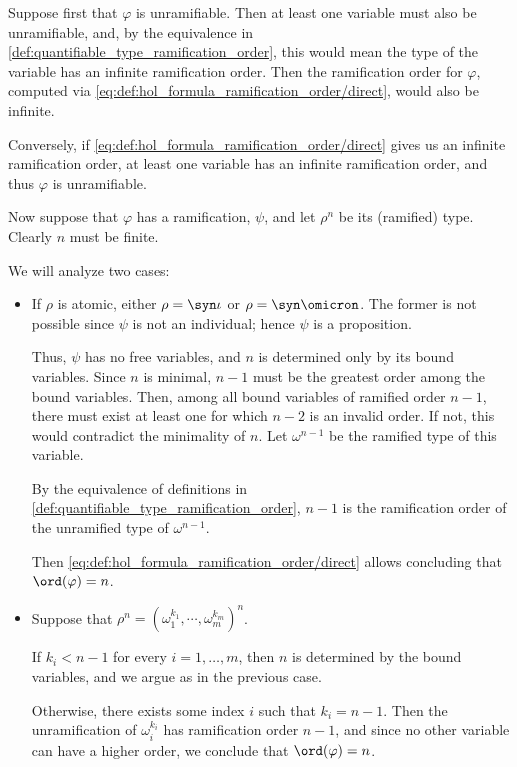 \begin{defproof}
  Suppose first that \( \varphi \) is unramifiable. Then at least one variable must also be unramifiable, and, by the equivalence in \cref{def:quantifiable_type_ramification_order}, this would mean the type of the variable has an infinite ramification order. Then the ramification order for \( \varphi \), computed via \eqref{eq:def:hol_formula_ramification_order/direct}, would also be infinite.

  Conversely, if \eqref{eq:def:hol_formula_ramification_order/direct} gives us an infinite ramification order, at least one variable has an infinite ramification order, and thus \( \varphi \) is unramifiable.

  Now suppose that \( \varphi \) has a ramification, \( \psi \), and let \( \rho^n \) be its (ramified) type. Clearly \( n \) must be finite.

  We will analyze two cases:
  \begin{itemize}
    \item If \( \rho \) is atomic, either \( \rho = \syn\iota \) or \( \rho = \syn\omicron \). The former is not possible since \( \psi \) is not an individual; hence \( \psi \) is a proposition.

    Thus, \( \psi \) has no free variables, and \( n \) is determined only by its bound variables. Since \( n \) is minimal, \( n - 1 \) must be the greatest order among the bound variables. Then, among all bound variables of ramified order \( n - 1 \), there must exist at least one for which \( n - 2 \) is an invalid order. If not, this would contradict the minimality of \( n \). Let \( \omega^{n-1} \) be the ramified type of this variable.

    By the equivalence of definitions in \cref{def:quantifiable_type_ramification_order}, \( n - 1 \) is the ramification order of the unramified type of \( \omega^{n-1} \).

    Then \eqref{eq:def:hol_formula_ramification_order/direct} allows concluding that \( \ord(\varphi) = n \).

    \item Suppose that \( \rho^n = (\omega_1^{k_1}, \cdots, \omega_m^{k_m})^n \).

    If \( k_i < n - 1 \) for every \( i = 1, \ldots, m \), then \( n \) is determined by the bound variables, and we argue as in the previous case.

    Otherwise, there exists some index \( i \) such that \( k_i = n - 1 \). Then the unramification of \( \omega_i^{k_i} \) has ramification order \( n - 1 \), and since no other variable can have a higher order, we conclude that \( \ord(\varphi) = n \).
  \end{itemize}
\end{defproof}

